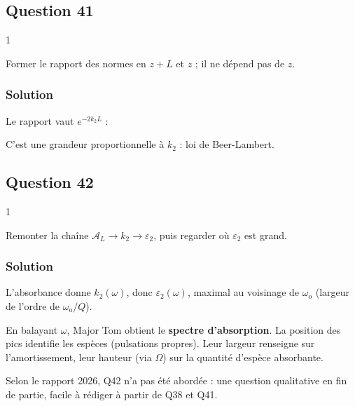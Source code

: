 \documentclass[11pt,a4paper]{article}
\newcommand{\equationajustee}[1]{%
  \sbox{\boiteequation}{$\displaystyle #1$}%
  \ifdim\wd\boiteequation>\linewidth
    \[\resizebox{\linewidth}{!}{\usebox{\boiteequation}}\]%
  \else
    \[#1\]%
  \fi}
\begin{document}
\hypertarget{question-41}{%
\subsection{Question 41}\label{question-41}}

\begin{indication}{1}

Former le rapport des normes en \(z+L\) et \(z\) ; il ne dépend pas de \(z\).

\end{indication}

\hypertarget{solution-40}{%
\subsubsection{Solution}\label{solution-40}}

Le rapport vaut \(e^{-2k_2L}\) :

\equationajustee{\boxed{\mathcal A_L=\frac{2L}{\ln10}k_2(\omega)}}

C'est une grandeur proportionnelle à \(k_2\) : loi de Beer-Lambert.

\hypertarget{question-42}{%
\subsection{Question 42}\label{question-42}}

\begin{indication}{1}

Remonter la chaîne \(\mathcal A_L\to k_2\to\varepsilon_2\), puis regarder où \(\varepsilon_2\) est grand.

\end{indication}

\hypertarget{solution-41}{%
\subsubsection{Solution}\label{solution-41}}

L'absorbance donne \(k_2(\omega)\), donc \(\varepsilon_2(\omega)\), maximal au voisinage de \(\omega_{\mathrm{o}}\) (largeur de l'ordre de \(\omega_{\mathrm{o}}/Q\)).

En balayant \(\omega\), Major Tom obtient le \textbf{spectre d'absorption}. La position des pics identifie les espèces (pulsations propres). Leur largeur renseigne sur l'amortissement, leur hauteur (via \(\Omega\)) sur la quantité d'espèce absorbante.

\begin{jury}

Selon le rapport 2026, Q42 n'a pas été abordée : une question qualitative en fin de partie, facile à rédiger à partir de Q38 et Q41.

\end{jury}
\end{document}
